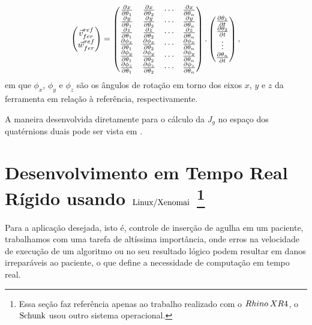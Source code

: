 \begin{equation}
\begin{pmatrix}\vec{v}_{fer}^{ref}\\
\vec{w}_{fer}^{ref}
\end{pmatrix}=\begin{pmatrix}\frac{\partial x}{\partial\theta_{1}} & \frac{\partial x}{\partial\theta_{2}} & \cdots & \frac{\partial x}{\partial\theta_{n}}\\
\frac{\partial y}{\partial\theta_{1}} & \frac{\partial y}{\partial\theta_{2}} & \cdots & \frac{\partial y}{\partial\theta_{n}}\\
\frac{\partial z}{\partial\theta_{1}} & \frac{\partial z}{\partial\theta_{2}} & \cdots & \frac{\partial z}{\partial\theta_{n}}\\
\frac{\partial\phi_{x}}{\partial\theta_{1}} & \frac{\partial\phi_{x}}{\partial\theta_{2}} & \cdots & \frac{\partial\phi_{x}}{\partial\theta_{n}}\\
\frac{\partial\phi_{y}}{\partial\theta_{1}} & \frac{\partial\phi_{y}}{\partial\theta_{2}} & \cdots & \frac{\partial\phi_{y}}{\partial\theta_{n}}\\
\frac{\partial\phi_{z}}{\partial\theta_{1}} & \frac{\partial\phi_{z}}{\partial\theta_{2}} & \cdots & \frac{\partial\phi_{z}}{\partial\theta_{n}}
\end{pmatrix}.\begin{pmatrix}\frac{\partial\theta_{1}}{\partial t}\\
\frac{\partial\theta_{2}}{\partial t}\\
\vdots\\
\frac{\partial\theta_{n}}{\partial t}
\end{pmatrix},
\end{equation}
em que $\phi_{x}$, $\phi_{y}$ e $\phi_{z}$ são os ângulos de rotação
em torno dos eixos $x$, $y$ e $z$ da ferramenta em relação à referência,
respectivamente.

A maneira desenvolvida diretamente para o cálculo da $J_{g}$ no espaço
dos quatérnions duais pode ser vista em \cite{Adorno2011}.


\section{Desenvolvimento em Tempo Real Rígido\textit{ }usando $\text{Linux/Xenomai}$%
\footnote{Essa seção faz referência apenas ao trabalho realizado com o $Rhino\: XR4$,
o $\text{{Schunk}}$ usou outro sistema operacional.%
}\label{sub:Linux}}

Para a aplicação desejada, isto é, controle de inserção de agulha
em um paciente, trabalhamos com uma tarefa de altíssima importância,
onde erros na velocidade de execução de um algoritmo ou no seu resultado
lógico podem resultar em danos irreparáveis ao paciente, o que define
a necessidade de computação em tempo real. 

